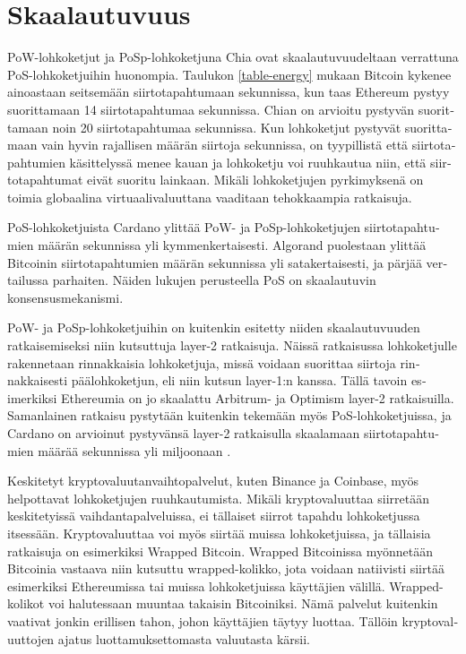 \section{Skaalautuvuus\label{skaalautuvuus}}
\begin{otherlanguage}{english}

PoW-lohkoketjut ja PoSp-lohkoketjuna Chia ovat skaalautuvuudeltaan verrattuna PoS-lohkoketjuihin huonompia. Taulukon \ref{table-energy} mukaan Bitcoin kykenee ainoastaan seitsemään siirtotapahtumaan sekunnissa, kun taas Ethereum pystyy suorittamaan 14 siirtotapahtumaa sekunnissa. Chian on arvioitu pystyvän suorittamaan noin 20 siirtotapahtumaa sekunnissa. Kun lohkoketjut pystyvät suorittamaan vain hyvin rajallisen määrän siirtoja sekunnissa, on tyypillistä että siirtotapahtumien käsittelyssä menee kauan ja lohkoketju voi ruuhkautua niin, että siirtotapahtumat eivät suoritu lainkaan. Mikäli lohkoketjujen pyrkimyksenä on toimia globaalina virtuaalivaluuttana vaaditaan tehokkaampia ratkaisuja.

PoS-lohkoketjuista Cardano ylittää PoW- ja PoSp-lohkoketjujen siirtotapahtumien määrän sekunnissa yli kymmenkertaisesti. Algorand puolestaan ylittää Bitcoinin siirtotapahtumien määrän sekunnissa yli satakertaisesti, ja pärjää vertailussa parhaiten. Näiden lukujen perusteella PoS on skaalautuvin konsensusmekanismi.

PoW- ja PoSp-lohkoketjuihin on kuitenkin esitetty niiden skaalautuvuuden ratkaisemiseksi niin kutsuttuja layer-2 ratkaisuja. Näissä ratkaisussa lohkoketjulle rakennetaan rinnakkaisia lohkoketjuja, missä voidaan suorittaa siirtoja rinnakkaisesti päälohkoketjun, eli niin kutsun layer-1:n kanssa. Tällä tavoin esimerkiksi Ethereumia on jo skaalattu Arbitrum- ja Optimism layer-2 ratkaisuilla. Samanlainen ratkaisu pystytään kuitenkin tekemään myös PoS-lohkoketjuissa, ja Cardano on arvioinut pystyvänsä layer-2 ratkaisulla skaalamaan siirtotapahtumien määrää sekunnissa yli miljoonaan \cite{cardano-hydra}.

Keskitetyt kryptovaluutanvaihtopalvelut, kuten Binance ja Coinbase, myös helpottavat lohkoketjujen ruuhkautumista. Mikäli kryptovaluuttaa siirretään keskitetyissä vaihdantapalveluissa, ei tällaiset siirrot tapahdu lohkoketjussa itsessään. Kryptovaluuttaa voi myös siirtää muissa lohkoketjuissa, ja tällaisia ratkaisuja on esimerkiksi Wrapped Bitcoin. Wrapped Bitcoinissa myönnetään Bitcoinia vastaava niin kutsuttu wrapped-kolikko, jota voidaan natiivisti siirtää esimerkiksi Ethereumissa tai muissa lohkoketjuissa käyttäjien välillä. Wrapped-kolikot voi halutessaan muuntaa takaisin Bitcoiniksi. Nämä palvelut kuitenkin vaativat jonkin erillisen tahon, johon käyttäjien täytyy luottaa. Tällöin kryptovaluuttojen ajatus luottamuksettomasta valuutasta kärsii.

\end{otherlanguage}